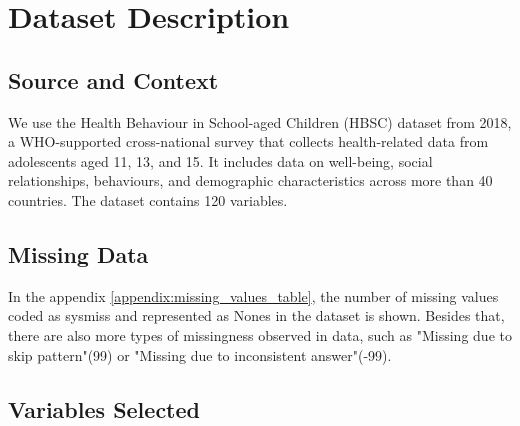 \documentclass[a4paper]{article}
\begin{document}
\section{Dataset Description}
\label{sec:dataset}

\subsection{Source and Context}
We use the Health Behaviour in School-aged Children (HBSC) dataset from 2018, a WHO-supported cross-national survey that collects health-related data from adolescents aged 11, 13, and 15. It includes data on well-being, social relationships, behaviours, and demographic characteristics across more than 40 countries. The dataset contains 120 variables. 

\subsection{Missing Data}
In the appendix \ref{appendix:missing_values_table}, the number of missing values coded as sysmiss and represented as Nones in the dataset is shown. Besides that, there are also more types of missingness observed in data, such as "Missing due to skip pattern"(99) or "Missing due to inconsistent answer"(-99). 

\subsection{Variables Selected}


\end{document}
